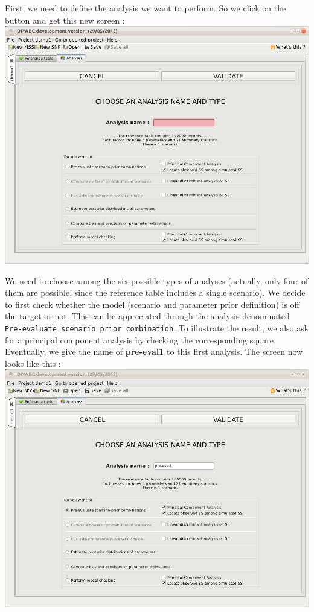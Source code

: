 First, we need to define the analysis we want to perform. So we click on the  button and get this new screen :\\

\includegraphics[scale=0.35]{gui_pictures/Capture-DIYABC-28.png} 

We need to choose among the six possible types of analyses (actually, only four of them are possible, since the reference table includes a single scenario). We decide to first check whether the model (scenario and parameter prior definition) is off the target or not. This can be appreciated through the analysis denominated \texttt{Pre-evaluate scenario prior combination}. To illustrate the result, we also ask for a principal component analysis by checking the corresponding square. Eventually, we give the name of \textbf{pre-eval1} to this first analysis. The screen now looks like this :\\

\includegraphics[scale=0.35]{gui_pictures/Capture-DIYABC-29.png}\\ 

